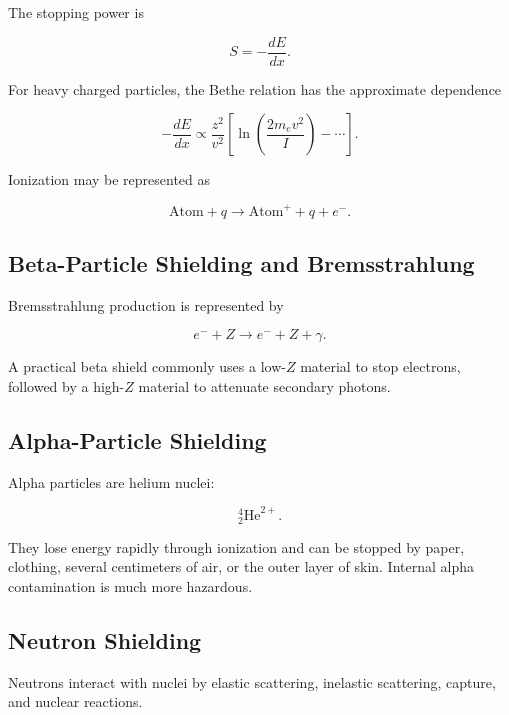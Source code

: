 \documentclass[12pt]{article}
\begin{document}
The stopping power is

\begin{equation}
\boxed{
S=-\frac{dE}{dx}
}.
\end{equation}

For heavy charged particles, the Bethe relation has the approximate dependence

\begin{equation}
-\frac{dE}{dx}
\propto
\frac{z^2}{v^2}
\left[
\ln\left(\frac{2m_ev^2}{I}\right)-\cdots
\right].
\end{equation}

Ionization may be represented as

\begin{equation}
\mathrm{Atom}+q
\rightarrow
\mathrm{Atom}^++q+e^-.
\end{equation}

\subsection{Beta-Particle Shielding and Bremsstrahlung}

Bremsstrahlung production is represented by

\begin{equation}
e^-+Z
\rightarrow
e^-+Z+\gamma.
\end{equation}

A practical beta shield commonly uses a low-$Z$ material to stop electrons, followed by a high-$Z$ material to attenuate secondary photons.

\subsection{Alpha-Particle Shielding}

Alpha particles are helium nuclei:

\begin{equation}
{}^4_2\mathrm{He}^{2+}.
\end{equation}

They lose energy rapidly through ionization and can be stopped by paper, clothing, several centimeters of air, or the outer layer of skin. Internal alpha contamination is much more hazardous.

\subsection{Neutron Shielding}

Neutrons interact with nuclei by elastic scattering, inelastic scattering, capture, and nuclear reactions.
\end{document}

